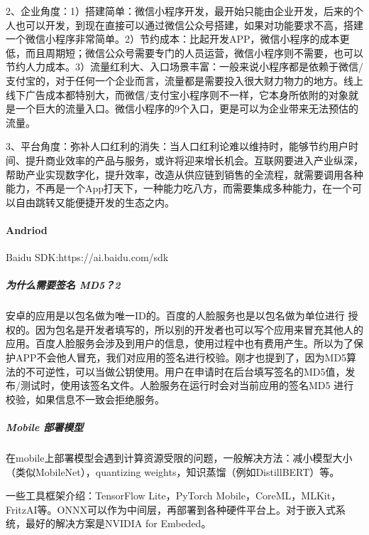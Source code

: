 \documentclass[letterpaper,10pt,english]{sphinxmanual}
\begin{document}
2、企业角度：1）搭建简单：微信小程序开发，最开始只能由企业开发，后来的个人也可以开发，到现在直接可以通过微信公众号搭建，如果对功能要求不高，搭建一个微信小程序非常简单。2）节约成本：比起开发APP，微信小程序的成本更低，而且周期短；微信公众号需要专门的人员运营，微信小程序则不需要，也可以节约人力成本。3）流量红利大、入口场景丰富：一般来说小程序都是依赖于微信/支付宝的，对于任何一个企业而言，流量都是需要投入很大财力物力的地方。线上线下广告成本都特别大，而微信/支付宝小程序则不一样，它本身所依附的对象就是一个巨大的流量入口。微信小程序的9个入口，更是可以为企业带来无法预估的流量。

3、平台角度：弥补人口红利的消失：当人口红利论难以维持时，能够节约用户时间、提升商业效率的产品与服务，或许将迎来增长机会。互联网要进入产业纵深，帮助产业实现数字化，提升效率，改造从供应链到销售的全流程，就需要调用各种能力，不再是一个App打天下，一种能力吃八方，而需要集成多种能力，在一个可以自由跳转又能便捷开发的生态之内。


\paragraph{Andriod}
\label{\detokenize{chapter_AI_dive/mobile:andriod}}
Baidu SDK:https://ai.baidu.com/sdk


\subparagraph{为什么需要签名 MD5？2\sphinxfootnotemark[972]}
\label{\detokenize{chapter_AI_dive/mobile:md5-2}}%
\begin{footnotetext}[972]\sphinxAtStartFootnote
{}
%
\end{footnotetext}\ignorespaces 
安卓的应用是以包名做为唯一ID的。百度的人脸服务也是以包名做为单位进行
授权的。因为包名是开发者填写的，所以别的开发者也可以写个应用来冒充其他人的应用。百度人脸服务会涉及到用户的信息，使用过程中也有费用产生。所以为了保护APP不会他人冒充，我们对应用的签名进行校验。刚才也提到了，因为MD5算法的不可逆性，可以当做公钥使用。用户在申请时在后台填写签名的MD5值，发布/测试时，使用该签名文件。人脸服务在运行时会对当前应用的签名MD5
进行校验，如果信息不一致会拒绝服务。


\subparagraph{Mobile 部署模型}
\label{\detokenize{chapter_AI_dive/mobile:mobile}}
在mobile上部署模型会遇到计算资源受限的问题，一般解决方法：减小模型大小（类似MobileNet），quantizing
weights，知识蒸馏（例如DistillBERT）等。

一些工具框架介绍：TensorFlow Lite，PyTorch
Mobile，CoreML，MLKit，FritzAI等。ONNX可以作为中间层，再部署到各种硬件平台上。对于嵌入式系统，最好的解决方案是NVIDIA
for Embeded。
\end{document}
